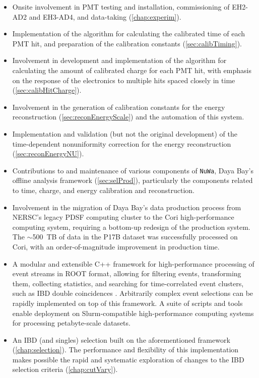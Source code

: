 \documentclass[../thesis.tex]{subfiles}
\begin{document}
\begin{itemize}
  \item Onsite involvement in PMT testing and installation, commissioning of EH2-AD2 and EH3-AD4, and data-taking (\autoref{chap:experim}).
  \item Implementation of the algorithm for calculating the calibrated time of each PMT hit, and preparation of the calibration constants (\autoref{sec:calibTiming}).
  \item Involvement in development and implementation of the algorithm for calculating the amount of calibrated charge for each PMT hit, with emphasis on the response of the electronics to multiple hits spaced closely in time (\autoref{sec:calibHitCharge}).
  \item Involvement in the generation of calibration constants for the energy reconstruction (\autoref{sec:reconEnergyScale}) and the automation of this system.
  \item Implementation and validation (but not the original development) of the time-dependent nonuniformity correction for the energy reconstruction (\autoref{sec:reconEnergyNU}).
  \item Contributions to and maintenance of various components of \texttt{NuWa}, Daya Bay's offline analysis framework (\autoref{sec:selProd}), particularly the components related to time, charge, and energy calibration and reconstruction.
  \item Involvement in the migration of Daya Bay's data production process from NERSC's legacy PDSF computing cluster to the Cori high-performance computing system, requiring a bottom-up redesign of the production system. The $\sim$500~TB of data in the P17B dataset was successfully processed on Cori, with an order-of-magnitude improvement in production time.
  \item A modular and extensible C++ framework for high-performance processing of event streams in ROOT format, allowing for filtering events, transforming them, collecting statistics, and searching for time-correlated event clusters, such as IBD double coincidences \cite{SelectorFramework}. Arbitrarily complex event selections can be rapidly implemented on top of this framework. A suite of scripts and tools enable deployment on Slurm-compatible high-performance computing systems for processing petabyte-scale datasets.
  \item An IBD (and singles) selection \cite{IbdSel} built on the aforementioned framework (\autoref{chap:selection}). The performance and flexibility of this implementation makes possible the rapid and systematic exploration of changes to the IBD selection criteria (\autoref{chap:cutVary}).

\end{itemize}
\end{document}
